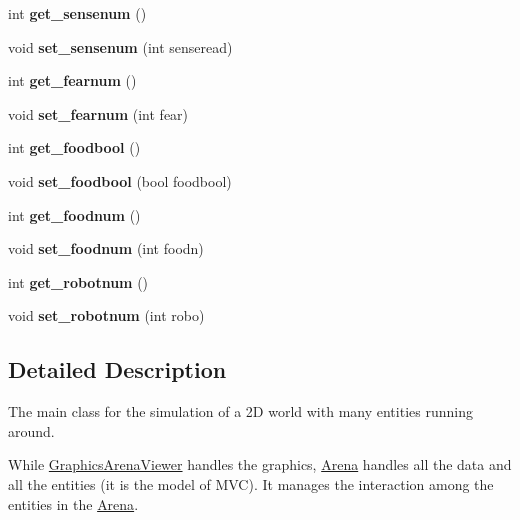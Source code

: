 \begin{DoxyCompactItemize}
int {\bfseries get\+\_\+sensenum} ()
\item 
\mbox{\label{class_arena_a29fdce304cbaa59ebbc5ac9be176ca7c}} 
void {\bfseries set\+\_\+sensenum} (int senseread)
\item 
\mbox{\label{class_arena_a5c390e5c39737651fcd6adf6d75f22d0}} 
int {\bfseries get\+\_\+fearnum} ()
\item 
\mbox{\label{class_arena_abe13ddb79918fc0c79466f0c1f6ed4a0}} 
void {\bfseries set\+\_\+fearnum} (int fear)
\item 
\mbox{\label{class_arena_a6d8e401f031fd4c0575da1cdda2e29b2}} 
int {\bfseries get\+\_\+foodbool} ()
\item 
\mbox{\label{class_arena_aac23ef1b2eb7e79e92448a6b1ff4fa84}} 
void {\bfseries set\+\_\+foodbool} (bool foodbool)
\item 
\mbox{\label{class_arena_afcd9b188d0230da3c6ecda363457e366}} 
int {\bfseries get\+\_\+foodnum} ()
\item 
\mbox{\label{class_arena_acfbb9ef84907c50da5fe6211456584eb}} 
void {\bfseries set\+\_\+foodnum} (int foodn)
\item 
\mbox{\label{class_arena_ab99c6e891dc16882317b683aac895581}} 
int {\bfseries get\+\_\+robotnum} ()
\item 
\mbox{\label{class_arena_a0d171dc53a3f9e9b63d691e1adbf05c0}} 
void {\bfseries set\+\_\+robotnum} (int robo)
\end{DoxyCompactItemize}


\subsection{Detailed Description}
The main class for the simulation of a 2D world with many entities running around. 

While \mbox{\hyperlink{class_graphics_arena_viewer}{Graphics\+Arena\+Viewer}} handles the graphics, \mbox{\hyperlink{class_arena}{Arena}} handles all the data and all the entities (it is the model of M\+VC). It manages the interaction among the entities in the \mbox{\hyperlink{class_arena}{Arena}}. 

